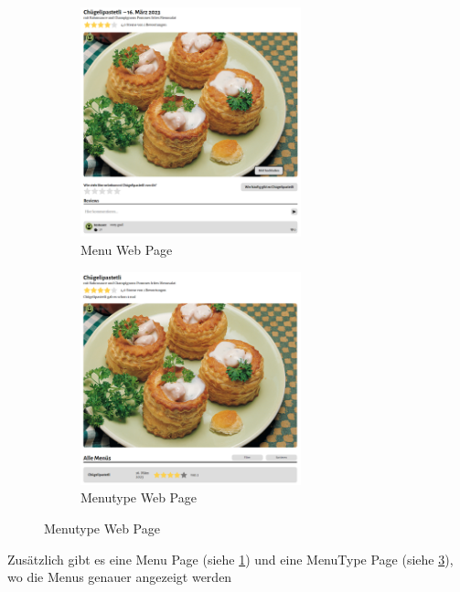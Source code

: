 \begin{figure}[htp]
    \begin{subfigure}[b]{0.5\textwidth}
        \centering
        \includegraphics[width=0.7\textwidth]{images/Res_Menu.png}
        \caption{Menu Web Page}
        \label{fig:r-menu}
    \end{subfigure}
    \begin{subfigure}[b]{0.5\textwidth}
        \centering
        \includegraphics[width=0.7\textwidth]{images/Res_Menutype.png}
        \caption{Menutype Web Page}
        \label{fig:r-menutype}
    \end{subfigure}
    \hfill
\end{figure}

Zusätzlich gibt es eine Menu Page (siehe \ref{fig:r-menu}) und eine MenuType
Page (siehe \ref{fig:r-menutype}), wo die Menus genauer angezeigt werden  




